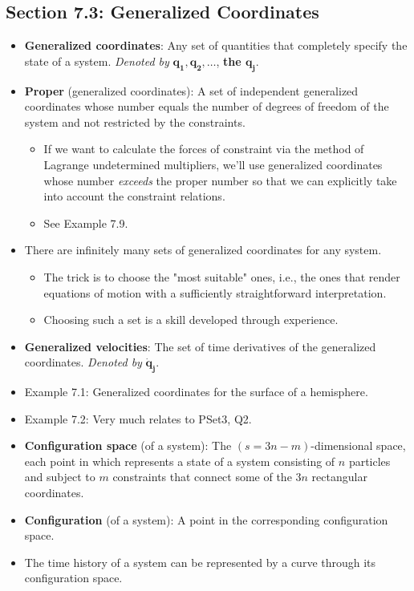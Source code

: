 \documentclass[../notes.tex]{subfiles}
\begin{document}
\subsection*{Section 7.3: Generalized Coordinates}
\begin{itemize}
    \item \textbf{Generalized coordinates}: Any set of quantities that completely specify the state of a system. \emph{Denoted by} $\bm{q_1,q_2,\ldots}$, \textbf{the $\bm{q_j}$}.
    \item \textbf{Proper} (generalized coordinates): A set of independent generalized coordinates whose number equals the number of degrees of freedom of the system and not restricted by the constraints.
    \begin{itemize}
        \item If we want to calculate the forces of constraint via the method of Lagrange undetermined multipliers, we'll use generalized coordinates whose number \emph{exceeds} the proper number so that we can explicitly take into account the constraint relations.
        \item See Example 7.9.
    \end{itemize}
    \item There are infinitely many sets of generalized coordinates for any system.
    \begin{itemize}
        \item The trick is to choose the "most suitable" ones, i.e., the ones that render equations of motion with a sufficiently straightforward interpretation.
        \item Choosing such a set is a skill developed through experience.
    \end{itemize}
    \item \textbf{Generalized velocities}: The set of time derivatives of the generalized coordinates. \emph{Denoted by} $\bm{\dot{q}_j}$.
    \item Example 7.1: Generalized coordinates for the surface of a hemisphere.
    \item Example 7.2: Very much relates to PSet3, Q2.
    \item \textbf{Configuration space} (of a system): The $(s=3n-m)$-dimensional space, each point in which represents a state of a system consisting of $n$ particles and subject to $m$ constraints that connect some of the $3n$ rectangular coordinates.
    \item \textbf{Configuration} (of a system): A point in the corresponding configuration space.
    \item The time history of a system can be represented by a curve through its configuration space.
\end{itemize}
\end{document}

